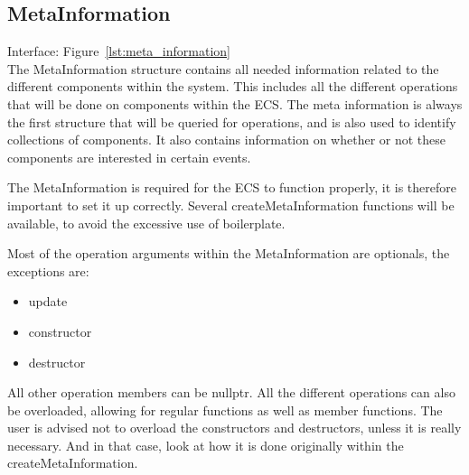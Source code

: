 \subsection{MetaInformation}
Interface: Figure~\ref{lst:meta_information}\\\noindent
The MetaInformation structure contains all needed information related to the different components within the system.
This includes all the different operations that will be done on components within the ECS.
The meta information is always the first structure that will be queried for operations, and is also used to identify collections of components.
It also contains information on whether or not these components are interested in certain events. 

The MetaInformation is required for the ECS to function properly, it is therefore important to set it up correctly.
Several createMetaInformation functions will be available, to avoid the excessive use of boilerplate.

Most of the operation arguments within the MetaInformation are optionals, the exceptions are:
\begin{itemize}
    \item update
    \item constructor
    \item destructor
\end{itemize}
All other operation members can be nullptr. All the different operations can also be overloaded, 
allowing for regular functions as well as member functions.
The user is advised not to overload the constructors and destructors, unless it is really necessary.
And in that case, look at how it is done originally within the createMetaInformation.

